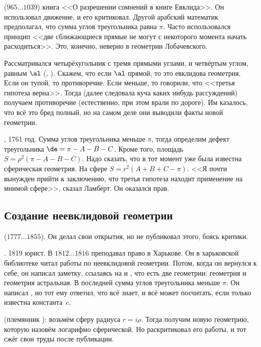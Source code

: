\documentclass[a4paper,oneside,fleqn,10pt]{article}
\newcommand{\pe}[2]{${#1}\ldots{#2}$}
\begin{document}
 (\pe{965}{1039}) книга <<О разрешении сомнений в
книге Евклида>>.  Он использовал движение, и  его критиковал.  Другой арабский математик 
предполагал, что сумма углов треугольника равна $\pi$.  Часто
использовался принцип <<две сближающиеся прямые не могут с некоторого
момента начать расходиться>>. Это, конечно, неверно в геометрии
Лобачевского.

Рассматривался четырёхугольник с тремя прямыми углами, и четвёртым
углом, равным $\al$ (, ).  Скажем, что
если $\al$ прямой, то это евклидова геометрия.  Если он тупой, то
противоречие. Если меньше, то говорили, что <<третья гипотеза верна>>.
Тогда (далее следовала куча каких нибудь рассуждений) получаем
противоречие (естественно, при этом врали по дороге).  Им казалось,
что всё это бред полный, но на самом деле они выводили факты новой
геометрии.

, 1761 год. Сумма углов треугольника меньше $\pi$, тогда
определим дефект треугольника $\de = \pi - A - B - C$. Кроме того,
площадь $S = \rho^2(\pi - A - B - C)$.  Надо сказать, что в тот момент
уже была известна сферическая геометрия. На сфере $S = r^2(A + B + C -
\pi)$.  <<Я почти вынужден прийти к заключению, что третья гипотеза
находит применение на мнимой сфере>>, сказал Ламберт. Он оказался
прав.

\subsection{Создание неевклидовой геометрии}

 (\pe{1777}{1855}). Он
делал свои открытия, но не публиковал этого, боясь критики.

. 1819 юрист. В \pe{1812}{1816} преподавал право в
Харькове.  Он в харьковской библиотеке читал работы
 по неевклидовой геометрии.  Потом, когда он
вернулся к себе, он написал заметку, ссылаясь на  и
, что есть две геометрии: геометрия
 и геометрия астральная.  В последней сумма
углов треугольника меньше $\pi$. Он написал , но
тот ему ответил, что всё знает, и всё может посчитать, если только
известна константа~$c$.

 (племянник ): возьмём сферу
радиуса $r = i\rho$. Тогда получим новую геометрию, которую назовём
логарифмо сферической. Но  раскритиковал его работы, и тот
сжёг свои труды после публикации.
\end{document}
